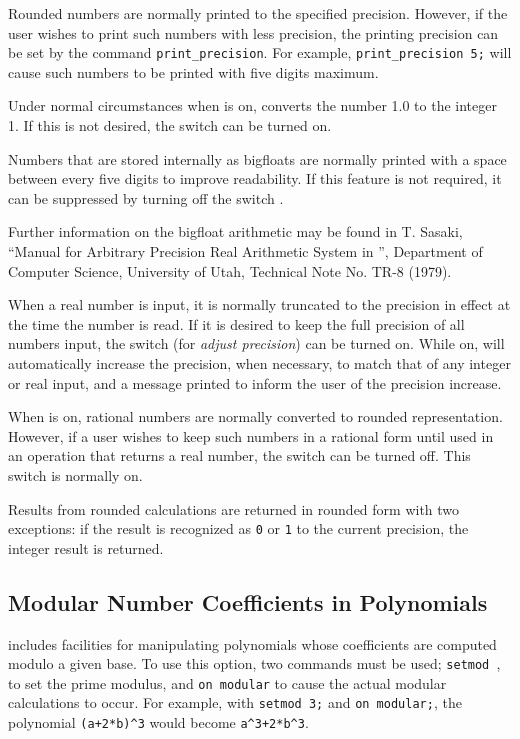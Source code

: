 \hypertarget{command:PRINT_PRECISION}{}
Rounded numbers are normally printed to the specified precision.  However,
if the user wishes to print such numbers with less precision, the printing
precision can be set by the command \texttt{print\_precision}.
 For example, \texttt{print\_precision 5;} will
cause such numbers to be printed with five digits maximum.

\hypertarget{switch:NOCONVERT}{}
Under normal circumstances when  is on, {\REDUCE} converts the
number 1.0 to the integer 1.  If this is not desired, the switch
 can be turned on.

\hypertarget{switch:BFSPACE}{}
Numbers that are stored internally as bigfloats are normally printed with
a space between every five digits to improve readability.  If this
feature is not required, it can be suppressed by turning off the switch
.

Further information on the bigfloat arithmetic may be found in T. Sasaki,
``Manual for Arbitrary Precision Real Arithmetic System in {\REDUCE}'',
Department of Computer Science, University of Utah, Technical Note No.
TR-8 (1979).

\hypertarget{switch:ADJPREC}{}
When a real number is input, it is normally truncated to the precision in
effect at the time the number is read.  If it is desired to keep the full
precision of all numbers input, the switch 
(for \emph{adjust precision}) can be turned on.  While on, 
will automatically increase the precision, when necessary, to match that
of any integer or real input, and a message printed to inform the user of
the precision increase.

\hypertarget{switch:ROUNDALL}{}
When  is on, rational numbers are normally converted to
rounded representation.  However, if a user wishes to keep such numbers in
a rational form until used in an operation that returns a real number,
the switch  can be turned off.  This
switch is normally on.

Results from rounded calculations are returned in rounded form with two
exceptions: if the result is recognized as \texttt{0} or \texttt{1} to the
current precision, the integer result is returned.

\subsection{Modular Number Coefficients in Polynomials}
\hypertarget{switch:MODULAR}{}
\hypertarget{command:SETMOD}{}
{\REDUCE} includes facilities for manipulating polynomials whose
coefficients are computed modulo a given base.  To use this option, two
commands must be used; \texttt{setmod }, to set
the prime modulus, and \texttt{on modular} to cause the
actual modular calculations to occur.
For example, with \texttt{setmod 3;} and \texttt{on modular;}, the polynomial
\texttt{(a+2*b)\textasciicircum3} would become 
\texttt{a\textasciicircum3+2*b\textasciicircum3}.

